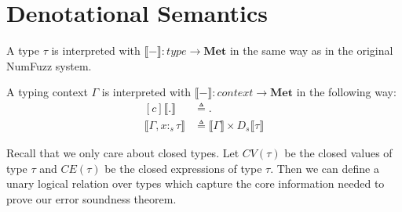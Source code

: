 \section{Denotational Semantics}

\begin{definition}
  A type $\tau$ is interpreted with $\llbracket - \rrbracket : \textit{type} \to
  \textbf{Met}$ in the same way as in the original NumFuzz system.
\end{definition}


\begin{definition}
  A typing context $\Gamma$ is interpreted with $\llbracket - \rrbracket :
  \textit{context} \to \textbf{Met}$ in the following way:
  \begin{equation}
  \begin{aligned}[c]
    \llbracket . \rrbracket &\triangleq . \\
    \llbracket \Gamma, x :_s \tau \rrbracket &\triangleq \llbracket \Gamma \rrbracket
      \times D_s \llbracket \tau \rrbracket
  \end{aligned}
  \end{equation}
\end{definition}

Recall that we only care about closed types.
Let $CV(\tau)$ be the closed values of type $\tau$ and $CE(\tau)$ be the closed
expressions of type $\tau$. Then we can define a unary logical relation over types which
capture the core information needed to prove our error soundness theorem.

